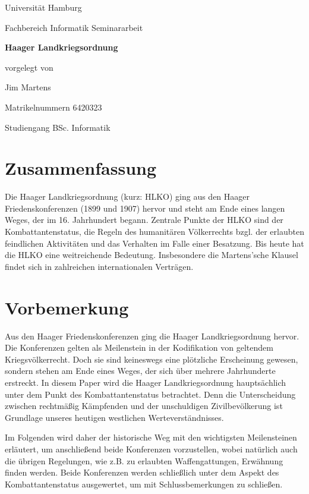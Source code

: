\documentclass[12pt]{scrartcl}
\begin{document}
\newpage
\thispagestyle{empty}
\begin{center}\Large
Universität Hamburg \par
Fachbereich Informatik
\vfill
Seminararbeit
\vfill
{\Large\textsf{\textbf{Haager Landkriegsordnung}}\par}
\vfill
vorgelegt von 
\par\bigskip
Jim Martens \par
Matrikelnummern 6420323 \par
Studiengang BSc. Informatik
\end{center}

\newpage
\section*{Zusammenfassung}
Die Haager Landkriegsordnung (kurz: HLKO) ging aus den Haager Friedenskonferenzen (1899 und 1907) hervor und steht am Ende eines langen Weges, der im 16. Jahrhundert begann. Zentrale Punkte der HLKO sind der Kombattantenstatus, die Regeln des humanitären Völkerrechts bzgl. der erlaubten feindlichen Aktivitäten und das Verhalten im Falle einer Besatzung. Bis heute hat die HLKO eine weitreichende Bedeutung. Insbesondere die Martens'sche Klausel findet sich in zahlreichen internationalen Verträgen.

\newpage
\tableofcontents

\newpage
\section{Vorbemerkung}
Aus den Haager Friedenskonferenzen ging die Haager Landkriegsordnung hervor. Die Konferenzen gelten als Meilenstein in der Kodifikation von geltendem Kriegsvölkerrecht. Doch sie sind keineswegs eine plötzliche Erscheinung gewesen, sondern stehen am Ende eines Weges, der sich über mehrere Jahrhunderte erstreckt. In diesem Paper wird die Haager Landkriegsordnung hauptsächlich unter dem Punkt des Kombattantenstatus betrachtet. Denn die Unterscheidung zwischen rechtmäßig Kämpfenden und der unschuldigen Zivilbevölkerung ist Grundlage unseres heutigen westlichen Werteverständnisses.

Im Folgenden wird daher der historische Weg mit den wichtigsten Meilensteinen erläutert, um anschließend beide Konferenzen vorzustellen, wobei natürlich auch die übrigen Regelungen, wie z.B. zu erlaubten Waffengattungen, Erwähnung finden werden. Beide Konferenzen werden schließlich unter dem Aspekt des Kombattantenstatus ausgewertet, um mit Schlussbemerkungen zu schließen.
\end{document}
